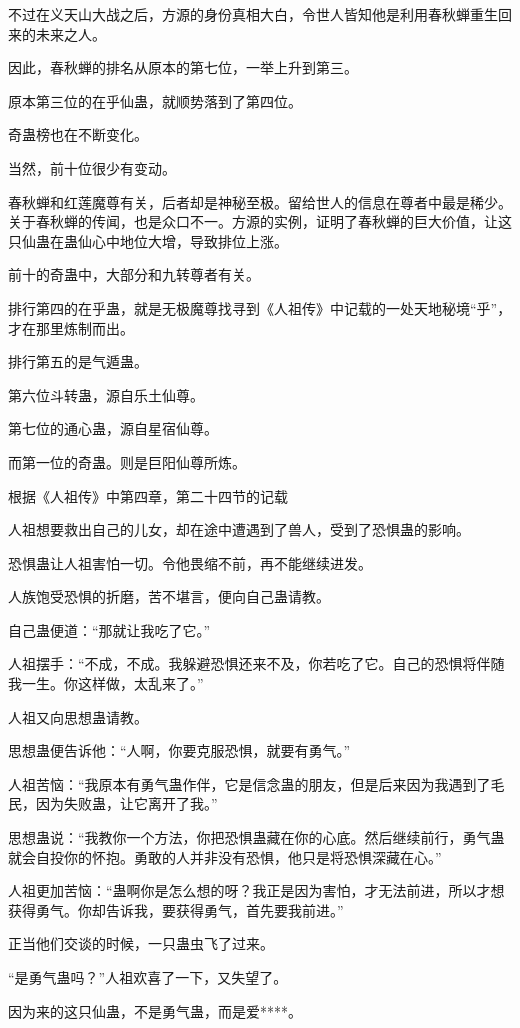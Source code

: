 \begin{this_body}
不过在义天山大战之后，方源的身份真相大白，令世人皆知他是利用春秋蝉重生回来的未来之人。

因此，春秋蝉的排名从原本的第七位，一举上升到第三。

原本第三位的在乎仙蛊，就顺势落到了第四位。

奇蛊榜也在不断变化。

当然，前十位很少有变动。

春秋蝉和红莲魔尊有关，后者却是神秘至极。留给世人的信息在尊者中最是稀少。关于春秋蝉的传闻，也是众口不一。方源的实例，证明了春秋蝉的巨大价值，让这只仙蛊在蛊仙心中地位大增，导致排位上涨。

前十的奇蛊中，大部分和九转尊者有关。

排行第四的在乎蛊，就是无极魔尊找寻到《人祖传》中记载的一处天地秘境“乎”，才在那里炼制而出。

排行第五的是气遁蛊。

第六位斗转蛊，源自乐土仙尊。

第七位的通心蛊，源自星宿仙尊。

而第一位的奇蛊。则是巨阳仙尊所炼。

根据《人祖传》中第四章，第二十四节的记载

人祖想要救出自己的儿女，却在途中遭遇到了兽人，受到了恐惧蛊的影响。

恐惧蛊让人祖害怕一切。令他畏缩不前，再不能继续进发。

人族饱受恐惧的折磨，苦不堪言，便向自己蛊请教。

自己蛊便道：“那就让我吃了它。”

人祖摆手：“不成，不成。我躲避恐惧还来不及，你若吃了它。自己的恐惧将伴随我一生。你这样做，太乱来了。”

人祖又向思想蛊请教。

思想蛊便告诉他：“人啊，你要克服恐惧，就要有勇气。”

人祖苦恼：“我原本有勇气蛊作伴，它是信念蛊的朋友，但是后来因为我遇到了毛民，因为失败蛊，让它离开了我。”

思想蛊说：“我教你一个方法，你把恐惧蛊藏在你的心底。然后继续前行，勇气蛊就会自投你的怀抱。勇敢的人并非没有恐惧，他只是将恐惧深藏在心。”

人祖更加苦恼：“蛊啊你是怎么想的呀？我正是因为害怕，才无法前进，所以才想获得勇气。你却告诉我，要获得勇气，首先要我前进。”

正当他们交谈的时候，一只蛊虫飞了过来。

“是勇气蛊吗？”人祖欢喜了一下，又失望了。

因为来的这只仙蛊，不是勇气蛊，而是爱****。


\end{this_body}
